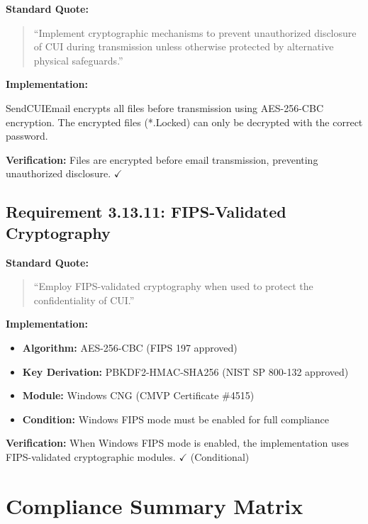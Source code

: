 \documentclass[11pt,letterpaper]{article}
\begin{document}
\textbf{Standard Quote:}
\begin{quote}
``Implement cryptographic mechanisms to prevent unauthorized disclosure of CUI during transmission unless otherwise protected by alternative physical safeguards.''
\end{quote}

\textbf{Implementation:}

SendCUIEmail encrypts all files before transmission using AES-256-CBC encryption. The encrypted files (*.Locked) can only be decrypted with the correct password.

\textbf{Verification:} Files are encrypted before email transmission, preventing unauthorized disclosure. $\checkmark$

\subsection{Requirement 3.13.11: FIPS-Validated Cryptography}

\textbf{Standard Quote:}
\begin{quote}
``Employ FIPS-validated cryptography when used to protect the confidentiality of CUI.''
\end{quote}

\textbf{Implementation:}

\begin{itemize}
    \item \textbf{Algorithm:} AES-256-CBC (FIPS 197 approved)
    \item \textbf{Key Derivation:} PBKDF2-HMAC-SHA256 (NIST SP 800-132 approved)
    \item \textbf{Module:} Windows CNG (CMVP Certificate \#4515)
    \item \textbf{Condition:} Windows FIPS mode must be enabled for full compliance
\end{itemize}

\textbf{Verification:} When Windows FIPS mode is enabled, the implementation uses FIPS-validated cryptographic modules. $\checkmark$ (Conditional)

\newpage
\section{Compliance Summary Matrix}
\end{document}
